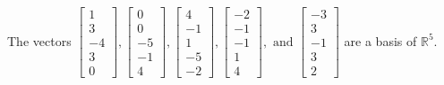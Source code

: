 \begin{exercise}
\begin{exerciseStatement}
  \end{exerciseStatement}
  \begin{exerciseAnswer}
   The vectors \(\left[\begin{array}{r}
1 \\
3 \\
-4 \\
3 \\
0
\end{array}\right] , \left[\begin{array}{r}
0 \\
0 \\
-5 \\
-1 \\
4
\end{array}\right] , \left[\begin{array}{r}
4 \\
-1 \\
1 \\
-5 \\
-2
\end{array}\right] , \left[\begin{array}{r}
-2 \\
-1 \\
-1 \\
1 \\
4
\end{array}\right] , \text{ and } \left[\begin{array}{r}
-3 \\
3 \\
-1 \\
3 \\
2
\end{array}\right]\) 
  	 are  a basis of \(\mathbb{R}^5\).
  


  \end{exerciseAnswer}
\end{exercise}